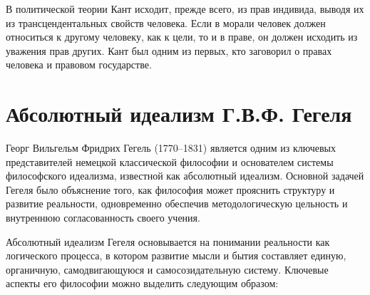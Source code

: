 \documentclass[12pt,a4paper]{article}
\begin{document}
	В политической теории Кант исходит, прежде всего, из прав индивида, выводя их из трансцендентальных свойств человека. Если в морали человек должен относиться к другому человеку, как к цели, то и в праве, он должен исходить из уважения прав других. Кант был одним из первых, кто заговорил о правах человека и правовом государстве.
	
	\section{Абсолютный идеализм Г.В.Ф. Гегеля~\checkmark}
	Георг Вильгельм Фридрих Гегель (1770–1831) является одним из ключевых представителей немецкой классической философии и основателем системы философского идеализма, известной как абсолютный идеализм. Основной задачей Гегеля было объяснение того, как философия может прояснить структуру и развитие реальности, одновременно обеспечив методологическую цельность и внутреннюю согласованность своего учения.
	
	Абсолютный идеализм Гегеля основывается на понимании реальности как логического процесса, в котором развитие мысли и бытия составляет единую, органичную, самодвигающуюся и самосозидательную систему. Ключевые аспекты его философии можно выделить следующим образом:
	
\end{document}
